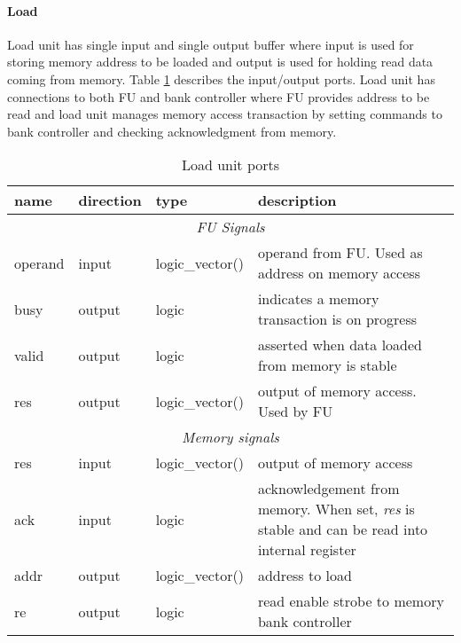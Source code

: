 	\paragraph{Load}
	Load unit has single input and single output buffer where input is used for storing memory address to be loaded and output is used for holding read data coming from memory. Table \ref{table:load_description} describes the input/output ports. Load unit has connections to both FU and bank controller where FU provides address to be read and load unit manages memory access transaction by setting commands to bank controller and checking acknowledgment from memory.
	\begin{table}[htbp]
		\begin{tabular}{| l| l | l | p{6cm} |}
			\hline
			\textbf{name} & \textbf{direction} & \textbf{type} &  \textbf{description}\\ \hline
			\multicolumn{4}{|c|}{\textit{FU Signals}} \\ \hline
			operand & input & logic\_vector(\bankAddrL) & operand from FU. Used as address on memory access \\ \hline
			busy & output & logic & indicates a memory transaction is on progress \\ \hline
			valid & output & logic & asserted when data loaded from memory is stable   \\ \hline
			res & output & logic\_vector(\memWordL) & output of memory access. Used by FU  \\ \hline
			\multicolumn{4}{|c|}{\textit{Memory signals}} \\ \hline
			res & input & logic\_vector(\memWordL) & output of memory access \\ \hline
			ack & input & logic & acknowledgement from memory. When set, \textit{res} is stable and can be read into internal register \\ \hline
			addr & output & logic\_vector(\bankAddrL) & address to load \\ \hline
			re & output & logic & read enable strobe to memory bank controller \\ \hline
		\end{tabular}
		
		\caption{Load unit ports \label{table:load_description}}
		\centering
	\end{table}
	
	
